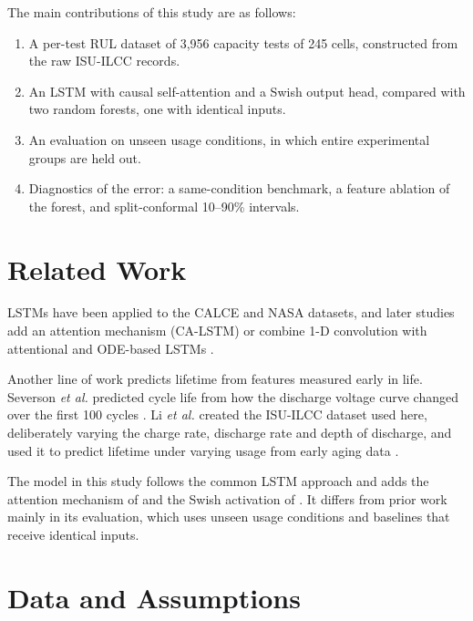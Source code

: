 \documentclass[conference]{IEEEtran}
\begin{document}
The main contributions of this study are as follows:
\begin{enumerate}
\item A per-test RUL dataset of 3,956 capacity tests of 245 cells, constructed from the raw ISU-ILCC records.
\item An LSTM with causal self-attention and a Swish output head, compared with two random forests, one with identical inputs.
\item An evaluation on unseen usage conditions, in which entire experimental groups are held out.
\item Diagnostics of the error: a same-condition benchmark, a feature ablation of the forest, and split-conformal 10--90\% intervals.
\end{enumerate}

\section{Related Work}
LSTMs have been applied to the CALCE \cite{liu2017} and NASA \cite{zraibi2025} datasets, and later studies add an attention mechanism (CA-LSTM) \cite{chen2023} or combine 1-D convolution with attentional and ODE-based LSTMs \cite{tran2025}.

Another line of work predicts lifetime from features measured early in life. Severson \emph{et al.} predicted cycle life from how the discharge voltage curve changed over the first 100 cycles \cite{severson2019}. Li \emph{et al.} created the ISU-ILCC dataset used here, deliberately varying the charge rate, discharge rate and depth of discharge, and used it to predict lifetime under varying usage from early aging data \cite{li2024,thelen2023}.

The model in this study follows the common LSTM approach and adds the attention mechanism of \cite{vaswani2017} and the Swish activation of \cite{ramachandran2017}. It differs from prior work mainly in its evaluation, which uses unseen usage conditions and baselines that receive identical inputs.

\section{Data and Assumptions}
\label{sec:data}
\end{document}
